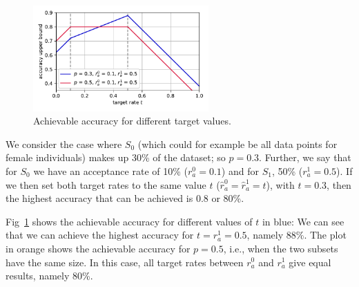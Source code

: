 \begin{figure}[t]
  \centering
  \includegraphics[width=0.6\textwidth]{./figures/plot.pdf}
  \caption{Achievable accuracy for different target values.}%
  \label{fig:accvstarget}
\end{figure}
\begin{example}
  We consider the case where $S_0$
  (which could for example be all data points for female individuals) makes up 30\% of the dataset; so $p = 0.3$.
  Further, we say that for $S_0$ we have an acceptance rate of 10\% ($r^0_a = 0.1$)
  and for $S_1$, 50\% ($r^1_a = 0.5$).
  If we then set both target rates to the same value $t$ ($\hat{r}^0_a=\hat{r}^1_a=t$), with $t = 0.3$,
  then the highest accuracy that can be achieved is $0.8$ or 80\%.

  Fig~\ref{fig:accvstarget} shows the achievable accuracy for different values of $t$ in blue:
  We can see that we can achieve the highest accuracy for $t=r^1_a=0.5$, namely 88\%.
  The plot in orange shows the achievable accuracy for $p=0.5$, i.e., when the two subsets have the same size.
  In this case, all target rates between $r^0_a$ and $r^1_a$ give equal results, namely 80\%.
\end{example}

